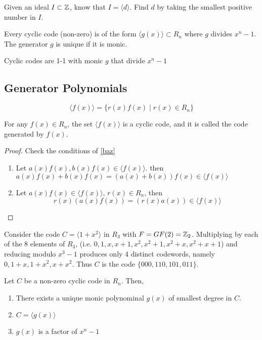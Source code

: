 \documentclass{article}
\begin{document}
\begin{example}
  Given an ideal \( I \subset \mathbb{Z} \), know that \( I = \langle d
  \rangle  \). Find \( d \) by taking the smallest positive number in \( I \).
\end{example}
\begin{theorem}
  Every cyclic code (non-zero) is of the form \( \langle g(x) \rangle
  \subset R_n \) where \( g \) divides \( x^n-1 \). The generator \(
  g \) is unique if it is monic.
\end{theorem}
\begin{corollary}
  Cyclic codes are 1-1 with monic \( g \) that divide \( x^n-1  \)
\end{corollary}

\subsection{Generator Polynomials}
\begin{definition}
  \[
    \langle f(x) \rangle = \{r(x)f(x) \mid r(x) \in R_n\}
  \]
\end{definition}
\begin{theorem}
  For any \( f(x) \in R_n \), the set \( \langle f(x) \rangle \) is a cyclic code,
  and it is called the code generated by \( f(x) \).
\end{theorem}
\begin{proof}
  Check the conditions of \autoref{baz}
  \begin{enumerate}
    \item Let \( a(x)f(x), b(x)f(x) \in \langle f(x) \rangle \). then \( a(x)f(x) + b(x)f(x) = (a(x)+b(x))f(x) \in \langle f(x) \rangle  \)
    \item Let \( a(x)f(x) \in \langle f(x) \rangle\), \( r(x) \in R_n \), then \[
            r(x)(a(x)f(x)) = (r(x)a(x)) \in \langle f(x) \rangle
          \]
  \end{enumerate}
\end{proof}
\begin{example}
  Consider the code \( C = \langle 1 + x^2 \rangle \) in \( R_3 \)
  with \( F = GF(2) =\mathbb{Z}_2\). Multiplying by each of the 8 elements of \(
  R_3 \), (i.e. \( 0, 1, x, x+1, x^2, x^2+1, x^2 + x, x^2+x+1 \)) and reducing modulo \( x^3-1 \) produces only 4 distinct
  codewords, namely \( 0, 1+x, 1+x^2, x+x^2 \). Thus \( C \) is the
  code \( \{000, 110, 101, 011\} \).
\end{example}
\begin{theorem}\label{bar}
  Let \( C  \) be a non-zero cyclic code in \( R_n \). Then,
  \begin{enumerate}
    \item There exists a unique monic polynominal \( g(x)\) of
          smallest degree in \( C \).
    \item \( C = \langle g(x) \rangle  \)
    \item \( g(x) \) is a factor of \( x^n-1 \)
  \end{enumerate}
\end{theorem}
\end{document}
